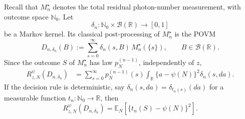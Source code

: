 \documentclass{article}
\theoremstyle{named}
\theoremstyle{named1}
\newcommand{\E}{\mathbb{E}}
\newcommand{\bbR}{\mathbb R}
\theoremstyle{plain}
\theoremstyle{remark}
\begin{document}
Recall that \(M_n^\star\) denotes the total residual photon-number
measurement, with outcome space \(\mathbb N_0\). Let
\[
    \delta_n:
    \mathbb N_0\times\mathcal B(\bbR)
    \rightarrow[0,1]
\]
be a Markov kernel. Its classical post-processing of \(M_n^\star\)
is the  POVM
\begin{equation}
    D_{n,\delta_n}(B)
    :=
    \sum_{s=0}^{\infty}
        \delta_n(s,B)\,
        M_n^\star(\{s\}),
    \qquad
    B\in\mathcal B(\bbR).
    \label{eq:thermal-postprocessed-povm}
\end{equation}
Since the outcome \(S\) of \(M_n^\star\) has law \(p_N^{(n-1)}\),
independently of \(z\),
\begin{equation}
\begin{aligned}
    R_{z,N}^{\psi}(D_{n,\delta_n})
    &=
    \sum_{s=0}^{\infty}
        p_N^{(n-1)}(s)
        \int_{\bbR}
            \{a-\psi(N)\}^2
            \delta_n(s,da).
\end{aligned}
    \label{eq:thermal-postprocessed-risk}
\end{equation}
If the decision rule is deterministic, say
\(\delta_n(s,da)=\delta_{t_n(s)}(da)\) for a measurable function
\(t_n:\mathbb N_0\to\bbR\), then
\begin{equation}
    R_{z,N}^{\psi}(D_{n,\delta_n})
    =
    \E_N
    \left[
        \{t_n(S)-\psi(N)\}^2
    \right].
    \label{eq:thermal-deterministic-postprocessed-risk}
\end{equation}
\end{document}
